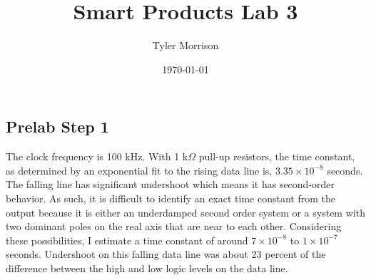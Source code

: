 \documentclass{article}
\title{Smart Products Lab 3}
\author{Tyler Morrison}
\date\today
\begin{document}
\maketitle
\section{}
\subsection{Prelab Step 1}
The clock frequency is 100 kHz.
With 1 k$\Omega$ pull-up resistors, the time constant, as determined by an exponential fit to the rising data line is, $3.35 \times 10^{-8}$ seconds.
The falling line has significant undershoot which means it has second-order behavior. As such, it is difficult to identify an exact time constant from the output because it is either an underdamped second order system or a system with two dominant poles on the real axis that are near to each other. Considering these possibilities, I estimate a time constant of around $7 \times 10^{-8}$ to $1 \times 10^{-7}$ seconds.
Undershoot on this falling data line was about 23 percent of the difference between the high and low logic levels on the data line.
\end{document}
